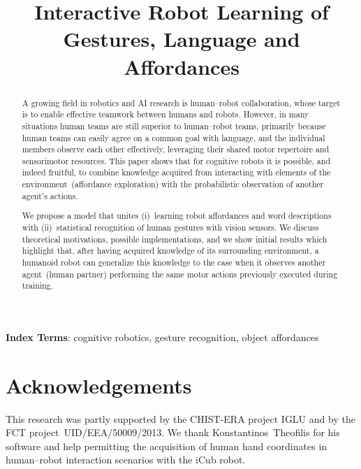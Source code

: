 \documentclass[a4paper]{article}
\title{Interactive Robot Learning of Gestures, Language and Affordances}
\newcommand{\hr}{human--robot}
\newcommand{\hri}{\hr{} interaction}
\begin{document}
\maketitle
%
\begin{abstract} %
A growing field in robotics and \ac{AI} research is \hr{} collaboration, whose target is to enable effective teamwork between humans and robots. However, in many situations human teams are still superior to \hr{} teams, primarily because human teams can easily agree on a common goal with language, and the individual members observe each other effectively, leveraging their shared motor repertoire and sensorimotor resources. This paper shows that for cognitive robots it is possible, and indeed fruitful, to combine knowledge acquired from interacting with elements of the environment~(affordance exploration) with the probabilistic observation of another agent's actions.

We propose a model that unites (i)~learning robot affordances and word descriptions with (ii)~statistical recognition of human gestures with vision sensors. We discuss theoretical motivations, possible implementations, and we show initial results which highlight that, after having acquired knowledge of its surrounding environment, a humanoid robot can generalize this
knowledge to the case when it observes another agent~(human partner) performing the same motor actions previously executed during training.
\end{abstract}
\noindent\textbf{Index Terms}: cognitive robotics, gesture recognition, object affordances











\section{Acknowledgements}
This research was partly supported by the CHIST-ERA project IGLU and by the FCT project~UID/EEA/50009/2013.
We thank Konstantinos~Theofilis for his software and help permitting the acquisition of human hand coordinates in \hri{} scenarios with the iCub robot.%



\end{document}

